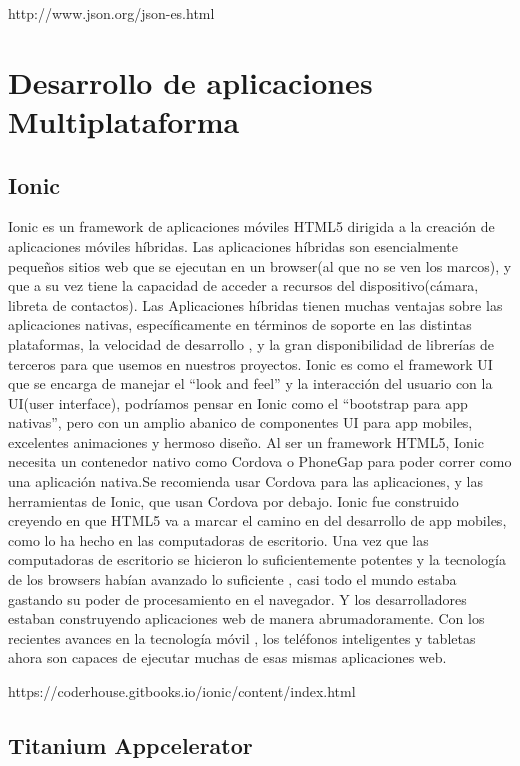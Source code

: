 http://www.json.org/json-es.html


\section{Desarrollo de aplicaciones Multiplataforma}

\subsection{Ionic}
Ionic es un framework de aplicaciones móviles HTML5 dirigida a la creación de aplicaciones móviles híbridas. Las aplicaciones híbridas son esencialmente pequeños sitios web que se ejecutan en un browser(al que no se ven los marcos), y que a su vez tiene la capacidad de acceder a recursos del dispositivo(cámara, libreta de contactos). Las Aplicaciones híbridas tienen muchas ventajas sobre las aplicaciones nativas, específicamente en términos de soporte en las distintas plataformas, la velocidad de desarrollo , y la gran disponibilidad de librerías de terceros para que usemos en nuestros proyectos.
Ionic es como el framework UI que se encarga de manejar el “look and feel” y la interacción del usuario con la UI(user interface), podríamos pensar en Ionic como el “bootstrap para app nativas”, pero con un amplio abanico de componentes UI para app mobiles, excelentes animaciones y hermoso diseño.
Al ser un framework HTML5, Ionic necesita un contenedor nativo como Cordova o PhoneGap para poder correr como una aplicación nativa.Se recomienda usar Cordova para las aplicaciones, y las herramientas de Ionic, que usan Cordova por debajo.
Ionic fue construido creyendo en que HTML5 va a marcar el camino en del desarrollo de app mobiles, como lo ha hecho en las computadoras de escritorio. Una vez que las computadoras de escritorio se hicieron lo suficientemente potentes y la tecnología de los browsers habían avanzado lo suficiente , casi todo el mundo estaba gastando su poder de procesamiento en el navegador. Y los desarrolladores estaban construyendo aplicaciones web de manera abrumadoramente. Con los recientes avances en la tecnología móvil , los teléfonos inteligentes y tabletas ahora son capaces de ejecutar muchas de esas mismas aplicaciones web.

https://coderhouse.gitbooks.io/ionic/content/index.html

\subsection{Titanium Appcelerator}


